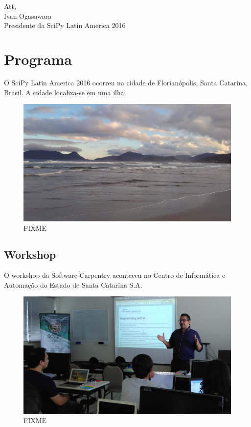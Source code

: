 \documentclass[12pt]{article}
\begin{document}
Att, \\
\indent Ivan Ogasawara \\
\indent Presidente da SciPy Latin America 2016


\newpage

\section*{Programa}

O SciPy Latin America 2016 ocorreu na cidade de Florianópolis, Santa Catarina,
Brasil. A cidade localiza-se em uma ilha.

\noindent  %
\begin{figure}[!htb]
\center
\includegraphics[height=.3\textheight]{venue-beach.jpg}
\caption{FIXME}
\end{figure}

\subsection*{Workshop}

O workshop da Software Carpentry aconteceu no Centro de Informática e Automação
do Estado de Santa Catarina S.A.

\noindent  %
\begin{figure}[!htb]
\center
\includegraphics[height=.3\textheight]{swc-francisco.jpg}
\caption{FIXME}
\end{figure}
\end{document}
